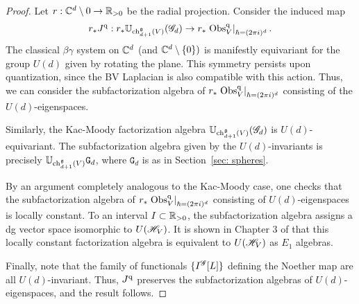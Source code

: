 
\begin{proof}
Let $r : \mathbb C^d \setminus 0 \to \mathbb R_{>0}$ be the radial projection. 
Consider the induced map
\[
r_* J^{\rm q} :  r_* \mathbb U_{{\rm ch}_{d+1}^\mathfrak g(V)} (\mathscr G_d) \to  r_* \left. {\rm Obs}^{\rm q}_V \right|_{\hbar = (2\pi i)^d}  .
\]
The classical $\beta\gamma$ system on $\mathbb C^d$ (and $\mathbb C^d \setminus \{0\})$ is manifestly equivariant for the group $U(d)$ given by rotating the plane. 
This symmetry persists upon quantization, since the BV Laplacian is also compatible with this action. 
Thus, we can consider the subfactorization algebra of $r_* \left. {\rm Obs}^{\rm q}_V \right|_{\hbar = (2\pi i)^d}$ consisting of the $U(d)$-eigenspaces. 

Similarly, the Kac-Moody factorization algebra $\mathbb U_{{\rm ch}_{d+1}^\mathfrak g(V)} (\mathscr G_d)$ is $U(d)$-equivariant. 
The subfactorization algebra given by the $U(d)$-invariants is precisely $\mathbb U_{{\rm ch}_{d+1}^\mathfrak g(V)} \mathtt{G}_d$, where $\mathtt{G}_d$ is as in Section~\ref{sec: spheres}. 

By an argument completely analogous to the Kac-Moody case, one checks that the subfactorization algebra of $r_* \left. {\rm Obs}^{\rm q}_V \right|_{\hbar = (2\pi i)^d}$ consisting of $U(d)$-eigenspaces is locally constant.
To an interval $I \subset \mathbb R_{>0}$, the subfactorization algebra assigns a dg vector space isomorphic to $U(\mathscr H_V)$. 
It is shown in Chapter 3 of \cite{BWthesis} that this locally constant factorization algebra is equivalent to $U(\mathscr H_V)$ as $E_1$ algebras. 

Finally, note that the family of functionals $\{I^{\mathscr G}[L]\}$ defining the Noether map are all $U(d)$-invariant.
Thus, $J^{\rm q}$ preserves the subfactorization algebras of $U(d)$-eigenspaces, and the result follows.
\end{proof}
